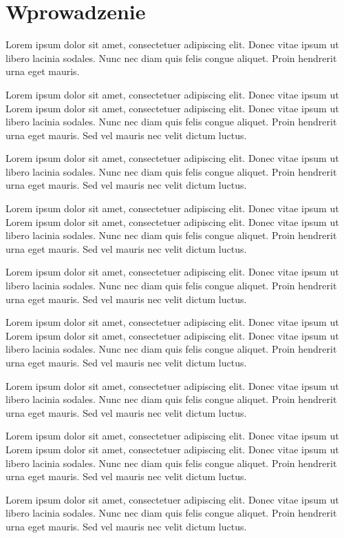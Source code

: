 \chapter{Wprowadzenie}

Lorem ipsum dolor sit amet, consectetuer adipiscing elit. Donec vitae ipsum ut
libero lacinia sodales. Nunc nec diam quis felis congue aliquet. Proin hendrerit
urna eget mauris.

Lorem ipsum dolor sit amet, consectetuer adipiscing elit. Donec vitae ipsum ut
Lorem ipsum dolor sit amet, consectetuer adipiscing elit. Donec vitae ipsum ut
libero lacinia sodales. Nunc nec diam quis felis congue aliquet. Proin hendrerit
urna eget mauris. Sed vel mauris nec velit dictum luctus.

Lorem ipsum dolor sit amet, consectetuer adipiscing elit. Donec vitae ipsum ut
libero lacinia sodales. Nunc nec diam quis felis congue aliquet. Proin hendrerit
urna eget mauris. Sed vel mauris nec velit dictum luctus.

Lorem ipsum dolor sit amet, consectetuer adipiscing elit. Donec vitae ipsum ut
Lorem ipsum dolor sit amet, consectetuer adipiscing elit. Donec vitae ipsum ut
libero lacinia sodales. Nunc nec diam quis felis congue aliquet. Proin hendrerit
urna eget mauris. Sed vel mauris nec velit dictum luctus.

Lorem ipsum dolor sit amet, consectetuer adipiscing elit. Donec vitae ipsum ut
libero lacinia sodales. Nunc nec diam quis felis congue aliquet. Proin hendrerit
urna eget mauris. Sed vel mauris nec velit dictum luctus.

Lorem ipsum dolor sit amet, consectetuer adipiscing elit. Donec vitae ipsum ut
Lorem ipsum dolor sit amet, consectetuer adipiscing elit. Donec vitae ipsum ut
libero lacinia sodales. Nunc nec diam quis felis congue aliquet. Proin hendrerit
urna eget mauris. Sed vel mauris nec velit dictum luctus.

Lorem ipsum dolor sit amet, consectetuer adipiscing elit. Donec vitae ipsum ut
libero lacinia sodales. Nunc nec diam quis felis congue aliquet. Proin hendrerit
urna eget mauris. Sed vel mauris nec velit dictum luctus.

Lorem ipsum dolor sit amet, consectetuer adipiscing elit. Donec vitae ipsum ut
Lorem ipsum dolor sit amet, consectetuer adipiscing elit. Donec vitae ipsum ut
libero lacinia sodales. Nunc nec diam quis felis congue aliquet. Proin hendrerit
urna eget mauris. Sed vel mauris nec velit dictum luctus.

Lorem ipsum dolor sit amet, consectetuer adipiscing elit. Donec vitae ipsum ut
libero lacinia sodales. Nunc nec diam quis felis congue aliquet. Proin hendrerit
urna eget mauris. Sed vel mauris nec velit dictum luctus.

